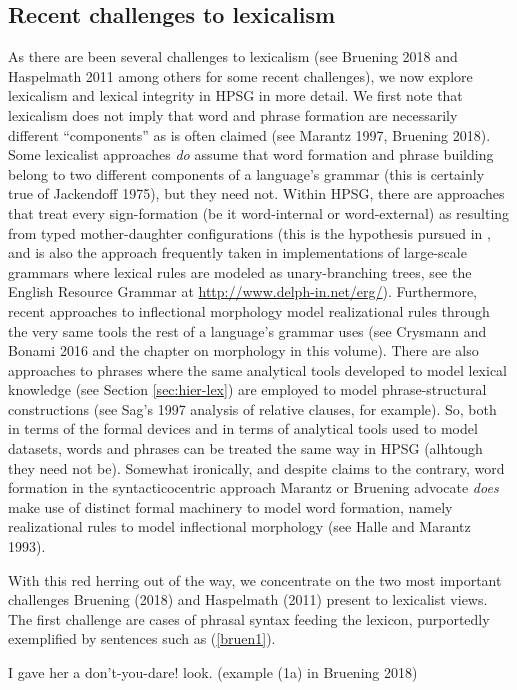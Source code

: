 \documentclass[output=paper]{langsci/langscibook}
\begin{document}
\subsection{Recent challenges to lexicalism}

As there are been several challenges to lexicalism (see Bruening 2018 and  Haspelmath 2011  among others for some recent challenges), we now explore lexicalism and lexical integrity in HPSG in more detail. We first note that lexicalism does not imply that word and phrase formation are necessarily different ``components'' as is often claimed (see Marantz 1997, Bruening 2018). Some lexicalist approaches \emph{do} assume that word formation and phrase building belong to two different components of a language's grammar (this is certainly true of Jackendoff 1975), but they need not. Within HPSG, there are approaches that treat every sign-formation (be it word-internal or word-external) as resulting from typed mother-daughter configurations (this is the hypothesis pursued in , and is also the approach frequently taken in implementations of large-scale grammars where lexical rules are modeled as unary-branching trees, see the English Resource Grammar at \url{http://www.delph-in.net/erg/}). Furthermore, recent approaches to inflectional morphology model realizational rules through the very same tools the rest of a language's grammar uses (see Crysmann and Bonami 2016 and the chapter on morphology in this volume).  There are also approaches to phrases where the same analytical tools developed to model lexical knowledge (see Section \ref{sec:hier-lex}) are employed to model phrase-structural constructions (see Sag's 1997 analysis of relative clauses, for example). So, both in terms of the formal devices and in terms of analytical tools used to model datasets, words and phrases can be treated the same way in HPSG (alhtough they need not be).
Somewhat ironically, and despite claims to the contrary, word formation in the syntacticocentric approach Marantz or Bruening advocate \emph{does} make use of distinct formal machinery to model word formation, namely realizational rules to model inflectional morphology (see Halle and Marantz 1993).

With this red herring out of the way, we concentrate on the two most important challenges Bruening (2018) and Haspelmath (2011) present to lexicalist views. The first challenge are cases of phrasal syntax feeding the lexicon, purportedly exemplified by sentences such as (\ref{bruen1}).

\begin{exe}
\ex\label{bruen1} I gave her a don't-you-dare! look. (example (1a) in Bruening 2018)
\end{exe}
\end{document}
